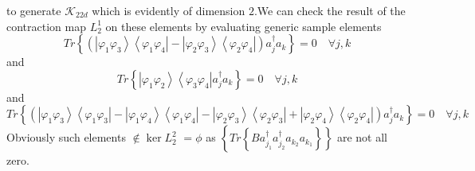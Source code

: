 \documentclass[aps,preprint]{revtex4}%
\begin{document}
to generate $\mathcal{K}_{22d}$ which is evidently of dimension $2.$We can
check the result of the contraction map $L_{2}^{1}$ on these elements by
evaluating generic sample elements
\[
Tr\left\{  \left(  \left\vert \varphi_{1}\varphi_{3}\right\rangle \left\langle
\varphi_{1}\varphi_{4}\right\vert -\left\vert \varphi_{2}\varphi
_{3}\right\rangle \left\langle \varphi_{2}\varphi_{4}\right\vert \right)
a_{j}^{\dagger}a_{k}\right\}  =0\quad\forall j,k
\]
and
\begin{equation}
Tr\left\{  \left\vert \varphi_{1}\varphi_{2}\right\rangle \left\langle
\varphi_{3}\varphi_{4}\right\vert a_{j}^{\dagger}a_{k}\right\}  =0\quad\forall
j,k
\end{equation}
and
\[
Tr\left\{  \left(  \left\vert \varphi_{1}\varphi_{3}\right\rangle \left\langle
\varphi_{1}\varphi_{3}\right\vert -\left\vert \varphi_{1}\varphi
_{4}\right\rangle \left\langle \varphi_{1}\varphi_{4}\right\vert -\left\vert
\varphi_{2}\varphi_{3}\right\rangle \left\langle \varphi_{2}\varphi
_{3}\right\vert +\left\vert \varphi_{2}\varphi_{4}\right\rangle \left\langle
\varphi_{2}\varphi_{4}\right\vert \right)  a_{j}^{\dagger}a_{k}\right\}
=0\quad\forall j,k
\]
Obviously such elements $\notin\ker L_{2}^{2}$ $=\phi$ as $\left\{  Tr\left\{
Ba_{j_{1}}^{\dagger}a_{j_{2}}^{\dagger}a_{k_{2}}a_{k_{1}}\right\}  \right\}  $
are not all zero.
\end{document}
